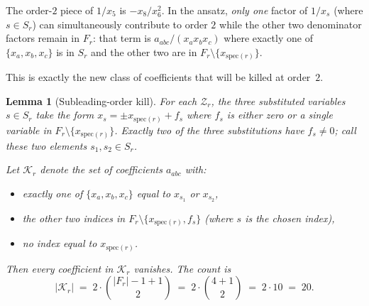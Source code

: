 \documentclass[11pt]{article}
\newcommand{\Z}{\mathcal{Z}}
\newcommand{\spec}{\mathrm{spec}}
\newtheorem{lemma}{Lemma}
\theoremstyle{definition}
\begin{document}
The order-$2$ piece of $1/x_5$ is $-x_8/x_6^2$. In the ansatz, \emph{only one}
factor of $1/x_s$ (where $s\in S_r$) can simultaneously contribute to order $2$
while the other two denominator factors remain in $F_r$: that term is
$a_{abc}/(x_a x_b x_c)$ where exactly one of $\{x_a,x_b,x_c\}$ is in $S_r$
and the other two are in $F_r\setminus\{x_{\spec(r)}\}$.

This is exactly the new class of coefficients that will be killed at order~$2$.

\begin{lemma}[Subleading-order kill]
\label{lem:order2}
For each $\Z_r$, the three substituted variables $s\in S_r$ take the form
$x_s = \pm x_{\spec(r)} + f_s$ where $f_s$ is either zero or a single
variable in $F_r\setminus\{x_{\spec(r)}\}$. Exactly two of the three
substitutions have $f_s\neq 0$; call these two elements $s_1,s_2\in S_r$.

Let $\mathcal{K}_r$ denote the set of coefficients $a_{abc}$ with:
\begin{itemize}[nosep]
  \item exactly one of $\{x_a,x_b,x_c\}$ equal to $x_{s_1}$ or $x_{s_2}$,
  \item the other two indices in $F_r\setminus\{x_{\spec(r)},f_s\}$ (where
    $s$ is the chosen index),
  \item no index equal to $x_{\spec(r)}$.
\end{itemize}
Then every coefficient in $\mathcal{K}_r$ vanishes. The count is
\[
|\mathcal{K}_r| \;=\; 2\cdot\binom{|F_r|-1+1}{2}\;=\;2\cdot\binom{4+1}{2}\;=\;2\cdot 10 \;=\; 20.
\]
\end{lemma}
\end{document}
